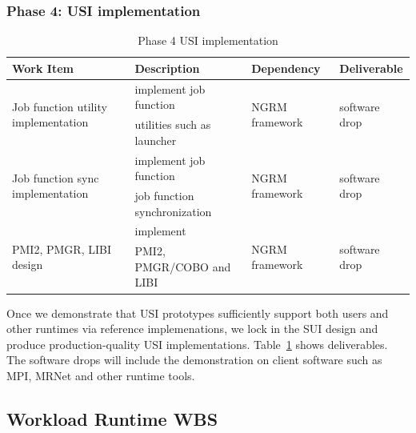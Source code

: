 \subsubsection{Phase 4: USI implementation}
\begin{table}
\centering
\begin{tabular}{|l|l|l|l|}
\hline
Work Item & Description & Dependency & Deliverable \\
\hline
\multirow{2}{*}{Job function utility implementation} & implement job function& \multirow{2}{*}{NGRM framework} & \multirow{2}{*}{software drop} \\
& utilities such as launcher & & \\ \hline
\multirow{2}{*}{Job function sync implementation} & implement job function& \multirow{2}{*}{NGRM framework} & \multirow{2}{*}{software drop} \\
& job function synchronization & & \\ \hline
\multirow{2}{*}{PMI2, PMGR, LIBI design} & implement & \multirow{2}{*}{NGRM framework} & \multirow{2}{*}{software drop} \\
& PMI2, PMGR/COBO and LIBI & & \\ \hline
\end{tabular}
\caption{Phase 4 USI implementation}
\label{tab:phase4}
\end{table}

Once we demonstrate that USI prototypes sufficiently support both users and
other runtimes via reference implemenations, we lock in the SUI design and
produce production-quality USI implementations. Table~\ref{tab:phase4} shows
deliverables. The software drops will include the demonstration on client
software such as MPI, MRNet and other runtime tools.

\ifwbs
\newpage
\subsection{Workload Runtime WBS}

